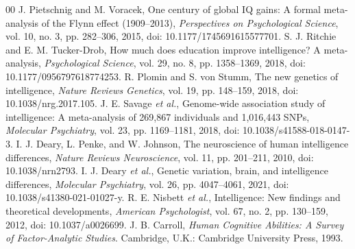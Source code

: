 \documentclass[conference]{IEEEtran}
\begin{document}
\begin{thebibliography}{00}
 J. Pietschnig and M. Voracek, One century of global IQ gains: A formal meta-analysis of the Flynn effect (1909--2013), \emph{Perspectives on Psychological Science}, vol. 10, no. 3, pp. 282--306, 2015, doi: 10.1177/1745691615577701.
 S. J. Ritchie and E. M. Tucker-Drob, How much does education improve intelligence? A meta-analysis, \emph{Psychological Science}, vol. 29, no. 8, pp. 1358--1369, 2018, doi: 10.1177/0956797618774253.
 R. Plomin and S. von Stumm, The new genetics of intelligence, \emph{Nature Reviews Genetics}, vol. 19, pp. 148--159, 2018, doi: 10.1038/nrg.2017.105.
 J. E. Savage \emph{et al.}, Genome-wide association study of intelligence: A meta-analysis of 269,867 individuals and 1,016,443 SNPs, \emph{Molecular Psychiatry}, vol. 23, pp. 1169--1181, 2018, doi: 10.1038/s41588-018-0147-3.
 I. J. Deary, L. Penke, and W. Johnson, The neuroscience of human intelligence differences, \emph{Nature Reviews Neuroscience}, vol. 11, pp. 201--211, 2010, doi: 10.1038/nrn2793.
 I. J. Deary \emph{et al.}, Genetic variation, brain, and intelligence differences, \emph{Molecular Psychiatry}, vol. 26, pp. 4047--4061, 2021, doi: 10.1038/s41380-021-01027-y.
 R. E. Nisbett \emph{et al.}, Intelligence: New findings and theoretical developments, \emph{American Psychologist}, vol. 67, no. 2, pp. 130--159, 2012, doi: 10.1037/a0026699.
 J. B. Carroll, \emph{Human Cognitive Abilities: A Survey of Factor-Analytic Studies}. Cambridge, U.K.: Cambridge University Press, 1993.
\end{thebibliography}
\end{document}
